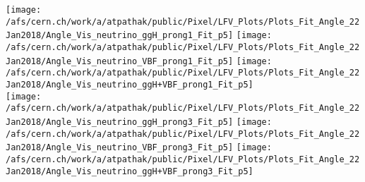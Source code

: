 \documentclass{beamer}
\begin{document}
\begin{frame}
\begin{normalsize}
\begin{center}
\texttt{[image: /afs/cern.ch/work/a/atpathak/public/Pixel/LFV\_Plots/Plots\_Fit\_Angle\_22Jan2018/Angle\_Vis\_neutrino\_ggH\_prong1\_Fit\_p5]}
\texttt{[image: /afs/cern.ch/work/a/atpathak/public/Pixel/LFV\_Plots/Plots\_Fit\_Angle\_22Jan2018/Angle\_Vis\_neutrino\_VBF\_prong1\_Fit\_p5]}
\texttt{[image: /afs/cern.ch/work/a/atpathak/public/Pixel/LFV\_Plots/Plots\_Fit\_Angle\_22Jan2018/Angle\_Vis\_neutrino\_ggH+VBF\_prong1\_Fit\_p5]}\\
\texttt{[image: /afs/cern.ch/work/a/atpathak/public/Pixel/LFV\_Plots/Plots\_Fit\_Angle\_22Jan2018/Angle\_Vis\_neutrino\_ggH\_prong3\_Fit\_p5]}
\texttt{[image: /afs/cern.ch/work/a/atpathak/public/Pixel/LFV\_Plots/Plots\_Fit\_Angle\_22Jan2018/Angle\_Vis\_neutrino\_VBF\_prong3\_Fit\_p5]}
\texttt{[image: /afs/cern.ch/work/a/atpathak/public/Pixel/LFV\_Plots/Plots\_Fit\_Angle\_22Jan2018/Angle\_Vis\_neutrino\_ggH+VBF\_prong3\_Fit\_p5]}\\
\end{center}
\end{normalsize}
\end {frame}
\end{document}

